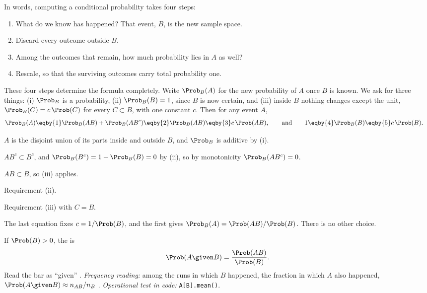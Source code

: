 In words, computing a conditional probability takes four steps:
\begin{enumerate}[leftmargin=1.5em,itemsep=1pt]
  \item What do we know has happened? That event, $B$, is the new sample space.
  \item Discard every outcome outside $B$.
  \item Among the outcomes that remain, how much probability lies in $A$ as well?
  \item Rescale, so that the surviving outcomes carry total probability one.
\end{enumerate}
These four steps determine the formula completely. Write $\Prob_B(A)$ for the new
probability of $A$ once $B$ is known. We ask for three things: (i) $\Prob_B$ is a
probability, (ii) $\Prob_B(B)=1$, since $B$ is now certain, and (iii) inside $B$
nothing changes except the unit, $\Prob_B(C)=c\,\Prob(C)$ for every $C\subset B$,
with one constant $c$. Then for any event $A$,
\begin{align*}
\Prob_B(A)
&\eqby{1}\Prob_B(AB)+\Prob_B(AB^c)
 \eqby{2}\Prob_B(AB)
 \eqby{3}c\,\Prob(AB),
\qquad\text{and}\qquad
1\eqby{4}\Prob_B(B)\eqby{5}c\,\Prob(B).
\end{align*}
\begin{explain}
  \item $A$ is the disjoint union of its parts inside and outside $B$, and
        $\Prob_B$ is additive by (i).
  \item $AB^c\subset B^c$, and $\Prob_B(B^c)=1-\Prob_B(B)=0$ by (ii), so by
        monotonicity $\Prob_B(AB^c)=0$.
  \item $AB\subset B$, so (iii) applies.
  \item Requirement (ii).
  \item Requirement (iii) with $C=B$.
\end{explain}
The last equation fixes $c=1/\Prob(B)$, and the first gives
$\Prob_B(A)=\Prob(AB)/\Prob(B)$. There is no other choice.

\begin{workdef}
If $\Prob(B)>0$, the  is
\begin{equation}
\Prob(A\given B)=\frac{\Prob(AB)}{\Prob(B)}.
\label{1a:eq:cond}
\end{equation}
Read the bar as ``given'' . \emph{Frequency reading:} among the runs in which $B$ happened, the
fraction in which $A$ also happened, $\Prob(A\given B)\approx n_{AB}/n_B$
.
\emph{Operational test in code:} \texttt{A[B].mean()}.
\end{workdef}

